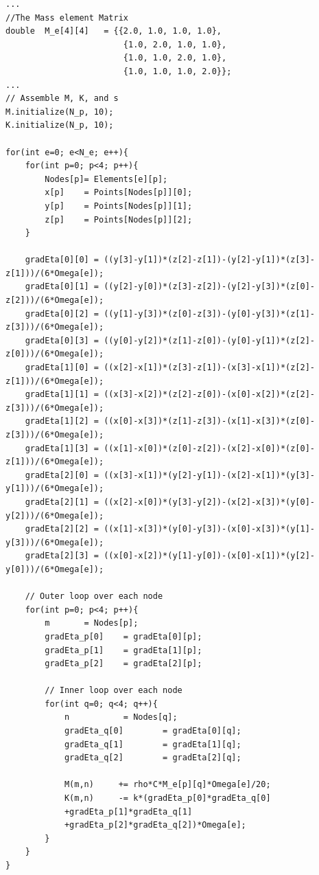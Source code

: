 \documentclass[12pt]{article}
\begin{document}
\begin{lstlisting}[style=MyC++Style]
...
//The Mass element Matrix
double	M_e[4][4]	= {{2.0, 1.0, 1.0, 1.0}, 
						{1.0, 2.0, 1.0, 1.0}, 
						{1.0, 1.0, 2.0, 1.0}, 
						{1.0, 1.0, 1.0, 2.0}};
...
// Assemble M, K, and s
M.initialize(N_p, 10);
K.initialize(N_p, 10);

for(int e=0; e<N_e; e++){
	for(int p=0; p<4; p++){
		Nodes[p]= Elements[e][p];
		x[p]	= Points[Nodes[p]][0];
		y[p]	= Points[Nodes[p]][1];
		z[p]	= Points[Nodes[p]][2]; 
	}

	gradEta[0][0] = ((y[3]-y[1])*(z[2]-z[1])-(y[2]-y[1])*(z[3]-z[1]))/(6*Omega[e]);
	gradEta[0][1] = ((y[2]-y[0])*(z[3]-z[2])-(y[2]-y[3])*(z[0]-z[2]))/(6*Omega[e]);
	gradEta[0][2] = ((y[1]-y[3])*(z[0]-z[3])-(y[0]-y[3])*(z[1]-z[3]))/(6*Omega[e]);
	gradEta[0][3] = ((y[0]-y[2])*(z[1]-z[0])-(y[0]-y[1])*(z[2]-z[0]))/(6*Omega[e]);
	gradEta[1][0] = ((x[2]-x[1])*(z[3]-z[1])-(x[3]-x[1])*(z[2]-z[1]))/(6*Omega[e]);
	gradEta[1][1] = ((x[3]-x[2])*(z[2]-z[0])-(x[0]-x[2])*(z[2]-z[3]))/(6*Omega[e]);
	gradEta[1][2] = ((x[0]-x[3])*(z[1]-z[3])-(x[1]-x[3])*(z[0]-z[3]))/(6*Omega[e]);
	gradEta[1][3] = ((x[1]-x[0])*(z[0]-z[2])-(x[2]-x[0])*(z[0]-z[1]))/(6*Omega[e]);
	gradEta[2][0] = ((x[3]-x[1])*(y[2]-y[1])-(x[2]-x[1])*(y[3]-y[1]))/(6*Omega[e]);
	gradEta[2][1] = ((x[2]-x[0])*(y[3]-y[2])-(x[2]-x[3])*(y[0]-y[2]))/(6*Omega[e]);
	gradEta[2][2] = ((x[1]-x[3])*(y[0]-y[3])-(x[0]-x[3])*(y[1]-y[3]))/(6*Omega[e]);
	gradEta[2][3] = ((x[0]-x[2])*(y[1]-y[0])-(x[0]-x[1])*(y[2]-y[0]))/(6*Omega[e]);

	// Outer loop over each node
	for(int p=0; p<4; p++){
		m		= Nodes[p];
		gradEta_p[0]	= gradEta[0][p];
		gradEta_p[1]	= gradEta[1][p];
		gradEta_p[2]	= gradEta[2][p];

		// Inner loop over each node
		for(int q=0; q<4; q++){
			n			= Nodes[q];
			gradEta_q[0]		= gradEta[0][q];
			gradEta_q[1]		= gradEta[1][q];
			gradEta_q[2]		= gradEta[2][q];

			M(m,n)	   += rho*C*M_e[p][q]*Omega[e]/20;
			K(m,n)	   -= k*(gradEta_p[0]*gradEta_q[0]
			+gradEta_p[1]*gradEta_q[1]
			+gradEta_p[2]*gradEta_q[2])*Omega[e];
		}
	}
}
\end{lstlisting}
\end{document}
